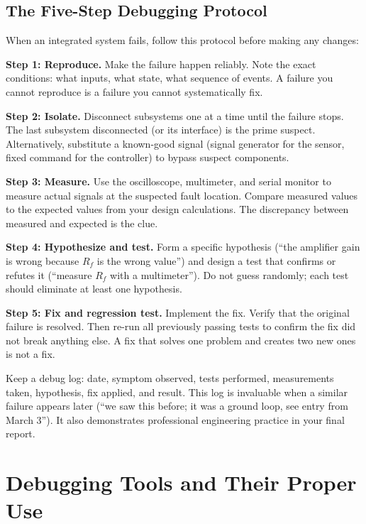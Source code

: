 \documentclass[11pt,letterpaper,twoside,openany]{book}
\begin{document}
\subsection{The Five-Step Debugging Protocol}
When an integrated system fails, follow this protocol before making any changes:

\textbf{Step 1: Reproduce.} Make the failure happen reliably. Note the exact conditions: what inputs, what state, what sequence of events. A failure you cannot reproduce is a failure you cannot systematically fix.

\textbf{Step 2: Isolate.} Disconnect subsystems one at a time until the failure stops. The last subsystem disconnected (or its interface) is the prime suspect. Alternatively, substitute a known-good signal (signal generator for the sensor, fixed command for the controller) to bypass suspect components.

\textbf{Step 3: Measure.} Use the oscilloscope, multimeter, and serial monitor to measure actual signals at the suspected fault location. Compare measured values to the expected values from your design calculations. The discrepancy between measured and expected is the clue.

\textbf{Step 4: Hypothesize and test.} Form a specific hypothesis (``the amplifier gain is wrong because $R_f$ is the wrong value'') and design a test that confirms or refutes it (``measure $R_f$ with a multimeter''). Do not guess randomly; each test should eliminate at least one hypothesis.

\textbf{Step 5: Fix and regression test.} Implement the fix. Verify that the original failure is resolved. Then re-run all previously passing tests to confirm the fix did not break anything else. A fix that solves one problem and creates two new ones is not a fix.

\begin{warningbox}
Keep a debug log: date, symptom observed, tests performed, measurements taken, hypothesis, fix applied, and result. This log is invaluable when a similar failure appears later (``we saw this before; it was a ground loop, see entry from March 3''). It also demonstrates professional engineering practice in your final report.
\end{warningbox}

\section{Debugging Tools and Their Proper Use}
\end{document}
